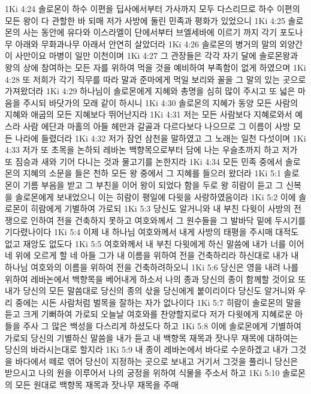 1Ki 4:24  솔로몬이 하수 이편을 딥사에서부터 가사까지 모두 다스리므로 하수 이편의 모든 왕이 다 관할한 바 되매 저가 사방에 둘린 민족과 평화가 있었으니
1Ki 4:25  솔로몬의 사는 동안에 유다와 이스라엘이 단에서부터 브엘세바에 이르기 까지 각기 포도나무 아래와 무화과나무 아래서 안연히 살았더라
1Ki 4:26  솔로몬의 병거의 말의 외양간이 사만이요 마병이 일만 이천이며
1Ki 4:27  그 관장들은 각각 자기 달에 솔로몬왕과 왕의 상에 참여하는 모든 자를 위하여 먹을 것을 예비하여 부족함이 없게 하였으며
1Ki 4:28  또 저희가 각기 직무를 따라 말과 준마에게 먹일 보리와 꼴을 그 말의 있는 곳으로 가져왔더라
1Ki 4:29  하나님이 솔로몬에게 지혜와 총명을 심히 많이 주시고 또 넓은 마음을 주시되 바닷가의 모래 같이 하시니
1Ki 4:30  솔로몬의 지혜가 동양 모든 사람의 지혜와 애굽의 모든 지혜보다 뛰어난지라
1Ki 4:31  저는 모든 사람보다 지혜로와서 예스라 사람 에단과 마홀의 아들 헤만과 갈골과 다르다보다 나으므로 그 이름이 사방 모든 나라에 들렸더라
1Ki 4:32  저가 잠언 삼천을 말하였고 그 노래는 일천 다섯이며
1Ki 4:33  저가 또 초목을 논하되 레바논 백향목으로부터 담에 나는 우슬초까지 하고 저가 또 짐승과 새와 기어 다니는 것과 물고기를 논한지라
1Ki 4:34  모든 민족 중에서 솔로몬의 지혜의 소문을 들은 천하 모든 왕 중에서 그 지혜를 들으러 왔더라
1Ki 5:1  솔로몬이 기름 부음을 받고 그 부친을 이어 왕이 되었다 함을 두로 왕 히람이 듣고 그 신복을 솔로몬에게 보내었으니 이는 히람이 평일에 다윗을 사랑하였음이라
1Ki 5:2  이에 솔로몬이 히람에게 기별하여 가로되
1Ki 5:3  당신도 알거니와 내 부친 다윗이 사방의 전쟁으로 인하여 전을 건축하지 못하고 여호와께서 그 원수들을 그 발바닥 밑에 두시기를 기다렸나이다
1Ki 5:4  이제 내 하나님 여호와께서 내게 사방의 태평을 주시매 대적도 없고 재앙도 없도다
1Ki 5:5  여호와께서 내 부친 다윗에게 하신 말씀에 내가 너를 이어 네 위에 오르게 할 네 아들 그가 내 이름을 위하여 전을 건축하리라 하신대로 내가 내 하나님 여호와의 이름을 위하여 전을 건축하려하오니
1Ki 5:6  당신은 영을 내려 나를 위하여 레바논에서 백향목을 베어내게 하소서 나의 종과 당신의 종이 함께할 것이요 또 내가 당신의 모든 말씀대로 당신의 종의 삯을 당신에게 붙이리이다 당신도 알거니와 우리 중에는 시돈 사람처럼 벌목을 잘하는 자가 없나이다
1Ki 5:7  히람이 솔로몬의 말을 듣고 크게 기뻐하여 가로되 오늘날 여호와를 찬양할지로다 저가 다윗에게 지혜로운 아들을 주사 그 많은 백성을 다스리게 하셨도다 하고
1Ki 5:8  이에 솔로몬에게 기별하여 가로되 당신의 기별하신 말씀을 내가 듣고 내 백향목 재목과 잣나무 재목에 대하여는 당신의 바라시는대로 할지라
1Ki 5:9  내 종이 레바논에서 바다로 수운하겠고 내가 그것을 바다에서 떼로 엮어 당신이 지정하는 곳으로 보내고 거기서 그것을 풀리니 당신은 받으시고 나의 원을 이루어서 나의 궁정을 위하여 식물을 주소서 하고
1Ki 5:10  솔로몬의 모든 원대로 백향목 재목과 잣나무 재목을 주매
